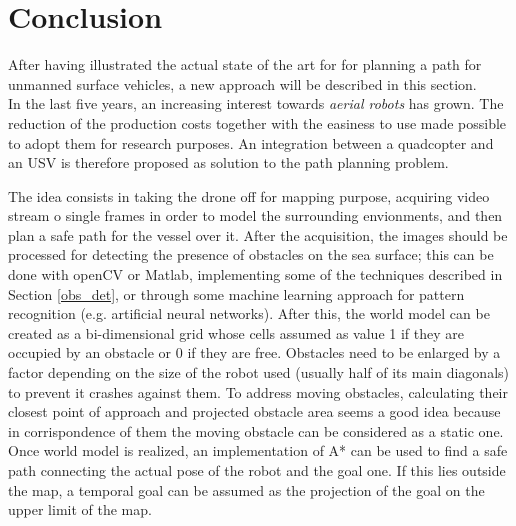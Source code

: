 \documentclass[12pt]{article}
\begin{document}
\section{Conclusion} \label{conclusion}

      After having illustrated the actual state of the art for for planning a path for unmanned surface vehicles, a new approach will be described in this section.\\
      \indent In the last five years, an increasing interest towards \textit{aerial robots} has grown. The reduction of the production costs together with the easiness to use made possible to adopt them for research purposes. An integration between a quadcopter and an USV is therefore proposed as solution to the path planning problem.

      The idea consists in taking the drone off for mapping purpose, acquiring video stream o single frames in order to model the surrounding envionments, and then plan a safe path for the vessel over it.
      After the acquisition, the images should be processed for detecting the presence of obstacles on the sea surface; this can be done with openCV or Matlab, implementing some of the techniques described in Section \ref{obs_det}, or through some machine learning approach for pattern recognition (e.g. artificial neural networks).
      After this, the world model can be created as a bi-dimensional grid whose cells assumed as value 1 if they are occupied by an obstacle or 0 if they are free. Obstacles need to be enlarged by a factor depending on the size of the robot used (usually half of its main diagonals) to prevent it crashes against them.
      To address moving obstacles, calculating their closest point of approach and projected obstacle area seems a good idea because in corrispondence of them the moving obstacle can be considered as a static one.
      Once world model is realized, an implementation of A* can be used to find a safe path connecting the actual pose of the robot and the goal one. If this lies outside the map, a temporal goal can be assumed as the projection of the goal on the upper limit of the map.
\end{document}
